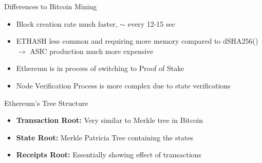 \documentclass[handout]{beamer}
\begin{document}
\begin{frame}{Differences to Bitcoin Mining}

\begin{itemize}
	\item<1-> Block creation rate much faster, $\sim$ every 12-15 sec
	\item<2-> ETHASH less common and requiring more memory compared to dSHA256() $\rightarrow$  ASIC production much more expensive
			\item<3-> Ethereum is in process of switching to Proof of Stake
			\item<4-> Node Verification Process is more complex due to state verifications
		\end{itemize}


		
\end{frame}

\begin{frame}{Ethereum’s Tree Structure}
\vspace{1em}
\vspace{1em}
\begin{itemize}
	\item<2-> \textbf{Transaction Root:} Very similar to Merkle tree in Bitcoin
	\item<3-> \textbf{State Root:} Merkle Patricia Tree containing the states
	\item<4-> \textbf{Receipts Root:} Essentially showing effect of transactions
\end{itemize}

\end{frame}
\end{document}
